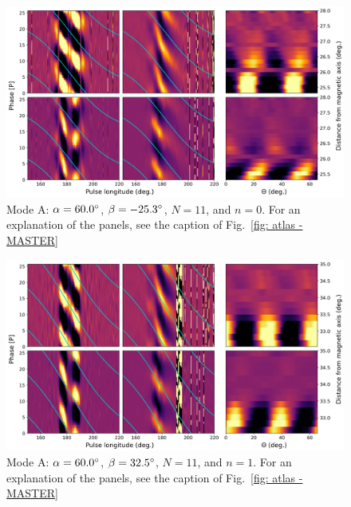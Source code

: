 \begin{figure}
	\begin{center}
		\includegraphics[width=\atlasHeightFrac\textwidth]{Figures/B0031/atlas/A_517060011000_plots}
		\caption[Atlas results: Mode A -- $\alpha=60.0\degr$, $\beta=-25.3\degr$, $N=11$, $n=0$]{Mode A: $\alpha=60.0\degr$, $\beta=-25.3\degr$, $N=11$, and $n=0$. For an explanation of the panels, see the caption of Fig.~\ref{fig: atlas - MASTER} }
		\label{fig: atlas - A_517060011000}
	\end{center}
\end{figure}

\begin{figure}
	\begin{center}
		\includegraphics[width=\atlasHeightFrac\textwidth]{Figures/B0031/atlas/A_517060011001_plots}
		\caption[Atlas results: Mode A -- $\alpha=60.0\degr$, $\beta=32.5\degr$, $N=11$, $n=1$]{Mode A: $\alpha=60.0\degr$, $\beta=32.5\degr$, $N=11$, and $n=1$. For an explanation of the panels, see the caption of Fig.~\ref{fig: atlas - MASTER} }
		\label{fig: atlas - A_517060011001}
	\end{center}
\end{figure}

